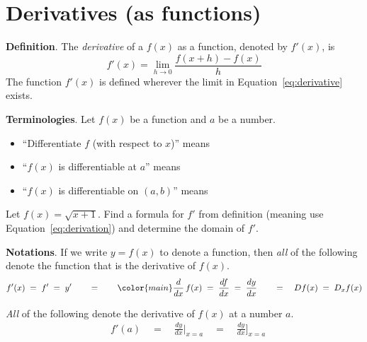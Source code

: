 \documentclass[../main.tex]{subfiles}
\begin{document}
 \section{Derivatives (as functions)}

\begin{mdframed}[style=withref]
  \textbf{Definition}. The \emph{derivative} of a \(f(x)\) as a function, denoted by \(f'(x)\), is
  \begin{equation} \label{eq:derivative}
    f'(x) = {\lim_{h \to 0} \frac{f(x+h) - f(x)}{h}}
  \end{equation}
  The function \(f'(x)\) is defined wherever the limit in Equation~\eqref{eq:derivative} exists.

\end{mdframed}
\textbf{Terminologies}. Let \(f(x)\) be a function and \(a\) be a number.
\begin{itemize}
  \item ``Differentiate \(f\) (with respect to \(x\))'' means \underline{\hspace{3in}}
  \item ``\(f(x)\) is differentiable at \(a\)'' means \underline{\hspace{3.62in}}
  \item ``\(f(x)\) is differentiable on \((a,b)\)'' means \underline{\hspace{3.36in}}
\end{itemize}

\bigskip
\begin{example}
  Let \(f(x) = \sqrt{x + 1}\). Find a formula for \(f'\) from definition (meaning use Equation~\eqref{eq:derivation}) and determine the domain of \(f'\).

\end{example}

\clearpage

\textbf{Notations}. If we write \(y = f(x)\) to denote a function, then \emph{all} of the following denote the function that is the derivative of \(f(x)\).
\[
  f'(x) 
  \;=\; f' 
  \;=\; y' 
  \qquad =\qquad  
  {\color{main} \frac{d}{dx}} \, f(x) \;=\; \frac{df}{dx} \;=\; \frac{dy}{dx}
  \qquad=\quad 
  Df(x) 
  \;=\; D_{x} f(x)
\]

\emph{All} of the following denote the derivative of \(f(x)\) at a number \(a\).
\begin{align*}
  & f'(a) \quad=\quad \frac{dy}{dx} \bigg|_{x = a} \quad=\quad \frac{dy}{dx} \bigg]_{x = a}
\end{align*}
\end{document}
